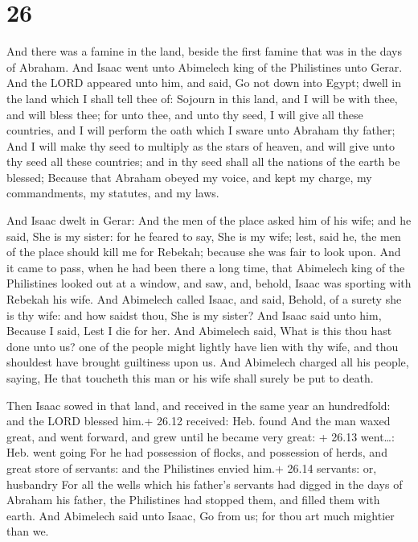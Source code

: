 \hypertarget{section-25}{%
\section{26}\label{section-25}}

 And there was a famine in the land, beside the first famine
that was in the days of Abraham. And Isaac went unto Abimelech king of
the Philistines unto Gerar.  And the LORD appeared unto him,
and said, Go not down into Egypt; dwell in the land which I shall tell
thee of:  Sojourn in this land, and I will be with thee, and
will bless thee; for unto thee, and unto thy seed, I will give all these
countries, and I will perform the oath which I sware unto Abraham thy
father;  And I will make thy seed to multiply as the stars
of heaven, and will give unto thy seed all these countries; and in thy
seed shall all the nations of the earth be blessed;  Because
that Abraham obeyed my voice, and kept my charge, my commandments, my
statutes, and my laws.

 And Isaac dwelt in Gerar:  And the men of the
place asked him of his wife; and he said, She is my sister: for he
feared to say, She is my wife; lest, said he, the men of the place
should kill me for Rebekah; because she was fair to look upon.
 And it came to pass, when he had been there a long time,
that Abimelech king of the Philistines looked out at a window, and saw,
and, behold, Isaac was sporting with Rebekah his wife.  And
Abimelech called Isaac, and said, Behold, of a surety she is thy wife:
and how saidst thou, She is my sister? And Isaac said unto him, Because
I said, Lest I die for her.  And Abimelech said, What is
this thou hast done unto us? one of the people might lightly have lien
with thy wife, and thou shouldest have brought guiltiness upon us.
 And Abimelech charged all his people, saying, He that
toucheth this man or his wife shall surely be put to death.

 Then Isaac sowed in that land, and received in the same
year an hundredfold: and the LORD blessed him.+ 26.12 received: Heb.
found  And the man waxed great, and went forward, and grew
until he became very great: + 26.13 went\ldots: Heb. went going
 For he had possession of flocks, and possession of herds,
and great store of servants: and the Philistines envied him.+ 26.14
servants: or, husbandry  For all the wells which his
father's servants had digged in the days of Abraham his father, the
Philistines had stopped them, and filled them with earth. 
And Abimelech said unto Isaac, Go from us; for thou art much mightier
than we.

